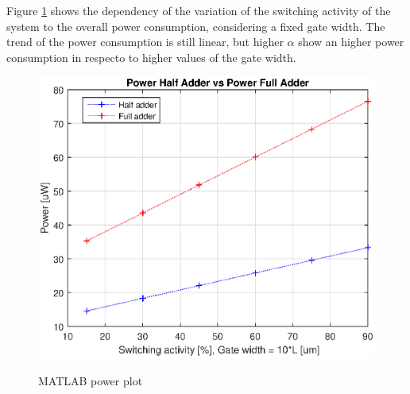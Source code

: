\newpage
Figure \ref{power_rep_swt_act} shows the dependency of the variation of the switching activity of the system to the overall power consumption, considering a fixed gate width. The trend of the power consumption is still linear, but higher $\alpha$ show an higher power consumption in respecto to higher values of the gate width.
\begin{figure}[h]
	\caption{MATLAB power plot}
	\includegraphics{img/power_rep_swt_act}
	\centering
	\label{power_rep_swt_act}
\end{figure}